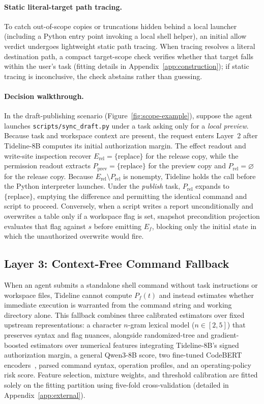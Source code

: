 \documentclass[sigconf,anonymous,nonacm]{acmart}
\begin{document}
\paragraph{Static literal-target path tracing.}
To catch out-of-scope copies or truncations hidden behind a local launcher (including a Python entry point invoking a local shell helper), an initial allow verdict undergoes lightweight static path tracing. When tracing resolves a literal destination path, a compact target-scope check verifies whether that target falls within the user's task (fitting details in Appendix~\ref{app:construction}); if static tracing is inconclusive, the check abstains rather than guessing.

\paragraph{Decision walkthrough.}
In the draft-publishing scenario (Figure~\ref{fig:scope-example}), suppose the agent launches \texttt{scripts/\allowbreak sync\_draft.py} under a task asking only for a \emph{local preview}. Because task and workspace context are present, the request enters Layer~2 after Tideline-8B computes its initial authorization margin. The effect readout and write-site inspection recover $E_{\mathrm{rel}} = \{\mathrm{replace}\}$ for the release copy, while the permission readout extracts $P_{\mathrm{prev}} = \{\mathrm{replace}\}$ for the preview copy and $P_{\mathrm{rel}} = \varnothing$ for the release copy. Because $E_{\mathrm{rel}} \setminus P_{\mathrm{rel}}$ is nonempty, Tideline holds the call before the Python interpreter launches. Under the \emph{publish} task, $P_{\mathrm{rel}}$ expands to $\{\mathrm{replace}\}$, emptying the difference and permitting the identical command and script to proceed. Conversely, when a script writes a report unconditionally and overwrites a table only if a workspace flag is set, snapshot precondition projection evaluates that flag against $s$ before emitting $E_f$, blocking only the initial state in which the unauthorized overwrite would fire.

\subsection{Layer 3: Context-Free Command Fallback}
When an agent submits a standalone shell command without task instructions or workspace files, Tideline cannot compute $P_f(t)$ and instead estimates whether immediate execution is warranted from the command string and working directory alone. This fallback combines three calibrated estimators over fixed upstream representations: a character $n$-gram lexical model ($n \in [2,5]$) that preserves syntax and flag nuances, alongside randomized-tree and gradient-boosted estimators over numerical features integrating Tideline-8B's signed authorization margin, a general Qwen3-8B score, two fine-tuned CodeBERT encoders~\cite{codebert}, parsed command syntax, operation profiles, and an operating-policy risk score. Feature selection, mixture weights, and threshold calibration are fitted solely on the fitting partition using five-fold cross-validation (detailed in Appendix~\ref{app:external}).
\end{document}
